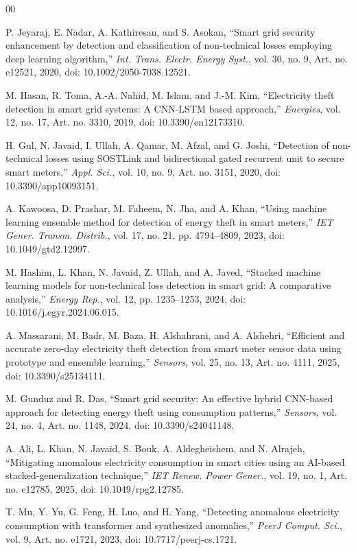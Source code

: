 \documentclass{ieeeaccess}
\begin{document}
\begin{thebibliography}{00}

P. Jeyaraj, E. Nadar, A. Kathiresan, and S. Asokan,
``Smart grid security enhancement by detection and classification of non-technical losses employing deep learning algorithm,''
\textit{Int. Trans. Electr. Energy Syst.},
vol. 30, no. 9, Art. no. e12521, 2020,
doi: 10.1002/2050-7038.12521.

M. Hasan, R. Toma, A.-A. Nahid, M. Islam, and J.-M. Kim,
``Electricity theft detection in smart grid systems: A CNN-LSTM based approach,''
\textit{Energies},
vol. 12, no. 17, Art. no. 3310, 2019,
doi: 10.3390/en12173310.

H. Gul, N. Javaid, I. Ullah, A. Qamar, M. Afzal, and G. Joshi,
``Detection of non-technical losses using SOSTLink and bidirectional gated recurrent unit to secure smart meters,''
\textit{Appl. Sci.},
vol. 10, no. 9, Art. no. 3151, 2020,
doi: 10.3390/app10093151.

A. Kawoosa, D. Prashar, M. Faheem, N. Jha, and A. Khan,
``Using machine learning ensemble method for detection of energy theft in smart meters,''
\textit{IET Gener. Transm. Distrib.},
vol. 17, no. 21, pp. 4794--4809, 2023,
doi: 10.1049/gtd2.12997.

M. Hashim, L. Khan, N. Javaid, Z. Ullah, and A. Javed,
``Stacked machine learning models for non-technical loss detection in smart grid: A comparative analysis,''
\textit{Energy Rep.},
vol. 12, pp. 1235--1253, 2024,
doi: 10.1016/j.egyr.2024.06.015.

A. Massarani, M. Badr, M. Baza, H. Alshahrani, and A. Alshehri,
``Efficient and accurate zero-day electricity theft detection from smart meter sensor data using prototype and ensemble learning,''
\textit{Sensors},
vol. 25, no. 13, Art. no. 4111, 2025,
doi: 10.3390/s25134111.

M. Gunduz and R. Das,
``Smart grid security: An effective hybrid CNN-based approach for detecting energy theft using consumption patterns,''
\textit{Sensors},
vol. 24, no. 4, Art. no. 1148, 2024,
doi: 10.3390/s24041148.

A. Ali, L. Khan, N. Javaid, S. Bouk, A. Aldegheishem, and N. Alrajeh,
``Mitigating anomalous electricity consumption in smart cities using an AI-based stacked-generalization technique,''
\textit{IET Renew. Power Gener.},
vol. 19, no. 1, Art. no. e12785, 2025,
doi: 10.1049/rpg2.12785.

T. Mu, Y. Yu, G. Feng, H. Luo, and H. Yang,
``Detecting anomalous electricity consumption with transformer and synthesized anomalies,''
\textit{PeerJ Comput. Sci.},
vol. 9, Art. no. e1721, 2023,
doi: 10.7717/peerj-cs.1721.


\end{thebibliography}
\end{document}
